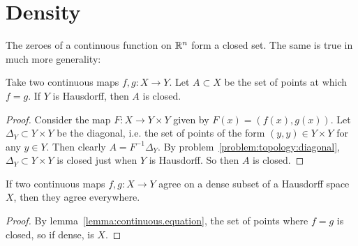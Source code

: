 \section{Density}
The zeroes of a continuous function on \(\mathbb{R}^{n}\) form a closed set.
The same is true in much more generality:
\begin{lemma}\label{lemma:continuous.equation}
Take two continuous maps \(f, g \colon X \to Y\).
Let \(A \subset X\) be the set of points at which \(f=g\).
If \(Y\) is Hausdorff, then \(A\) is closed.
\end{lemma}
\begin{proof}
Consider the map \(F \colon X \to Y \times Y\) given by \(F(x)=(f(x),g(x))\).
Let \(\Delta_Y \subset Y \times Y\) be the diagonal, i.e. the set of points of the form \((y,y) \in Y \times Y\) for any \(y \in Y\).
Then clearly \(A=F^{-1}\Delta_Y\). 
By problem~\vref{problem:topology:diagonal}, \(\Delta_Y \subset Y \times Y\) is closed just when \(Y\) is Hausdorff.
So then \(A\) is closed.
\end{proof}
\begin{lemma}
If two continuous maps \(f, g \colon X \to Y\) agree on a dense subset of a Hausdorff space \(X\), then they agree everywhere.
\end{lemma}
\begin{proof}
By lemma~\vref{lemma:continuous.equation}, the set of points where \(f=g\) is closed, so if dense, is \(X\).
\end{proof}

